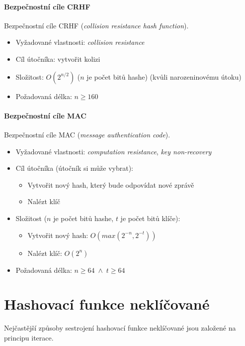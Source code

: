 \paragraph*{Bezpečnostní cíle CRHF} Bezpečnostní cíle CRHF (\textit{collision resistance hash function}). \begin{itemize}
    \item Vyžadované vlastnosti: \textit{collision resistance}
    \item Cíl útočníka: vytvořit kolizi
    \item Složitost: $O(2^{n / 2})$ ($n$ je počet bitů hashe) (kvůli narozeninovému útoku)
    \item Požadovaná délka: $n \geq 160$
\end{itemize}

\paragraph*{Bezpečnostní cíle MAC} Bezpečnostní cíle MAC (\textit{message authentication code}). \begin{itemize}
    \item Vyžadované vlastnosti: \textit{computation resistance}, \textit{key non-recovery}
    \item Cíl útočníka (útočník si může vybrat): \begin{itemize}
        \item Vytvořit nový hash, který bude odpovídat nové zprávě
        \item Nalézt klíč
    \end{itemize}
    \item Složitost ($n$ je počet bitů hashe, $t$ je počet bitů klíče): \begin{itemize}
        \item Vytvořit nový hash: $O(max(2^{-n}, 2^{-t}))$
        \item Nalézt klíč: $O(2^n)$
    \end{itemize}
    \item Požadovaná délka: $n \geq 64 \; \land \; t \geq 64$
\end{itemize}


\section{Hashovací funkce neklíčované}

Nejčastější způsoby sestrojení hashovací funkce neklíčované jsou založené na principu iterace.

